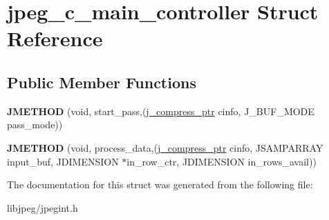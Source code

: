 \hypertarget{structjpeg__c__main__controller}{\section{jpeg\-\_\-c\-\_\-main\-\_\-controller Struct Reference}
\label{structjpeg__c__main__controller}
}
\subsection*{Public Member Functions}
\begin{DoxyCompactItemize}
\item 
\hypertarget{structjpeg__c__main__controller_a12d7c719a1598e04dafbddc0c3d6c1d5}{{\bfseries J\-M\-E\-T\-H\-O\-D} (void, start\-\_\-pass,(\hyperlink{structjpeg__compress__struct}{j\-\_\-compress\-\_\-ptr} cinfo, J\-\_\-\-B\-U\-F\-\_\-\-M\-O\-D\-E pass\-\_\-mode))}\label{structjpeg__c__main__controller_a12d7c719a1598e04dafbddc0c3d6c1d5}

\item 
\hypertarget{structjpeg__c__main__controller_aefb0f62e18af1d6087803ac65bfd9bb9}{{\bfseries J\-M\-E\-T\-H\-O\-D} (void, process\-\_\-data,(\hyperlink{structjpeg__compress__struct}{j\-\_\-compress\-\_\-ptr} cinfo, J\-S\-A\-M\-P\-A\-R\-R\-A\-Y input\-\_\-buf, J\-D\-I\-M\-E\-N\-S\-I\-O\-N $\ast$in\-\_\-row\-\_\-ctr, J\-D\-I\-M\-E\-N\-S\-I\-O\-N in\-\_\-rows\-\_\-avail))}\label{structjpeg__c__main__controller_aefb0f62e18af1d6087803ac65bfd9bb9}

\end{DoxyCompactItemize}


The documentation for this struct was generated from the following file\-:\begin{DoxyCompactItemize}
\item 
libjpeg/jpegint.\-h\end{DoxyCompactItemize}
